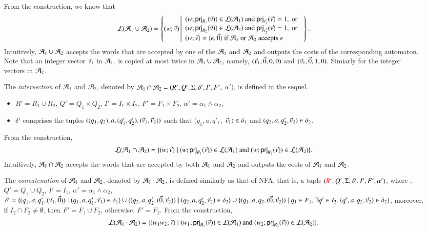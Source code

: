 From the construction, we know that 
$$
\mathcal{L}(\mathcal{A}_1 \cup \mathcal{A}_2) = 
\left\{(w; \vec{v}) \left \vert 
\begin{array}{l}
(w; {\sf prj}_{R_1}(\vec{v})) \in \mathcal{L}(\mathcal{A}_1) \mbox{ and } {\sf prj}_{r_1'}(\vec{v}) = 1, \mbox{ or } \\
(w; {\sf prj}_{R_2}(\vec{v})) \in \mathcal{L}(\mathcal{A}_2) \mbox{ and } {\sf prj}_{r_2'}(\vec{v}) = 1, \mbox{ or } \\
(w; \vec{v}) = (\epsilon, \vec{0}) \mbox{ if } \mathcal{A}_1 \mbox{ or } \mathcal{A}_2 \mbox{ accepts } \epsilon
\end{array}
\right.
\right\}.
$$ 
Intuitively, $\mathcal{A}_1 \cup \mathcal{A}_2$ accepts the words that are accepted by one of the $\mathcal{A}_1$ and $\mathcal{A}_2$ and outputs the costs of the corresponding automaton. Note that an integer vector $\vec{v}_1$ in $\mathcal{A}_1$, is copied at most twice in $\mathcal{A}_1 \cup \mathcal{A}_2$, namely, $(\vec{v}_1, \vec{0}, 0,0)$ and $(\vec{v}_1, \vec{0}, 1,0)$. Simiarly for the integer vectors in $\mathcal{A}_2$. 

The \emph{intersection} of $\mathcal{A}_1$ and $\mathcal{A}_2$, denoted by $\mathcal{A}_1 \cap \mathcal{A}_2 = (R', Q', \Sigma, \delta', I', F',$ $ \alpha')$, is defined in the sequel. 
\begin{itemize}
\item $R' = R_1 \cup R_2$, $Q' = Q_1 \times Q_2$, $I' = I_1 \times I_2$, $F' = F_1 \times F_2$, $\alpha' = \alpha_1 \wedge \alpha_2$, 
\item $\delta'$ comprises the tuples $((q_1, q_2), a, (q'_1, q'_2), (\vec{v}_1, \vec{v}_2))$ such that $(q_1,a, q'_1, $ $\vec{v}_1)\in \delta_1$ and $(q_2,a, q'_2, \vec{v}_2) \in \delta_2$.
\end{itemize}
From the construction, 
$$\mathcal{L}(\mathcal{A}_1 \cap \mathcal{A}_2) = \{(w; \vec{v}) \mid (w; {\sf prj}_{R_1}(\vec{v})) \in \mathcal{L}(\mathcal{A}_1) \mbox{ and } (w; {\sf prj}_{R_2}(\vec{v})) \in \mathcal{L}(\mathcal{A}_2)\}.$$
Intuitively, $\mathcal{A}_1 \cap \mathcal{A}_2$ accepts the words that are accepted by both $\mathcal{A}_1$ and $\mathcal{A}_2$ and outputs the costs of $\mathcal{A}_1$ and $\mathcal{A}_2$.  

The \emph{concatenation} of $\mathcal{A}_1$ and $\mathcal{A}_2$, denoted by $\mathcal{A}_1 \cdot \mathcal{A}_2$, is defined similarly as that of NFA, that is, a tuple $({\color{red}R'\color{black}}, Q', \Sigma, \delta', I', F', \alpha')$, where , $Q' = Q_1 \cup Q_2$, $I' = I_1$, $\alpha' = \alpha_1 \wedge \alpha_2$, $\delta' = \{(q_1, a, q'_1, (\vec{v}_1, \vec{0})) \mid (q_1, a, q'_1, \vec{v}_1) \in \delta_1\} \cup \{(q_2, a, q'_2, (\vec{0}, \vec{v}_2)) \mid (q_2, a, q'_2, \vec{v}_2) \in \delta_2\} \cup \{(q_1, a, q_2, (\vec{0}, \vec{v}_2)) \mid q_1 \in F_1, \exists q' \in I_2.\ (q', a, q_2, \vec{v}_2) \in \delta_2\}$, moreover, if $I_2 \cap F_2 \neq \emptyset$, then $F'= F_1 \cup F_2$, otherwise, $F'= F_2$. From the construction, 
$$\mathcal{L}(\mathcal{A}_1 \cdot \mathcal{A}_2) = \{(w_1w_2; \vec{v}) \mid (w_1; {\sf prj}_{R_1}(\vec{v})) \in \mathcal{L}(\mathcal{A}_1) \mbox{ and }(w_2; {\sf prj}_{R_2}(\vec{v})) \in \mathcal{L}(\mathcal{A}_2)\}.$$

